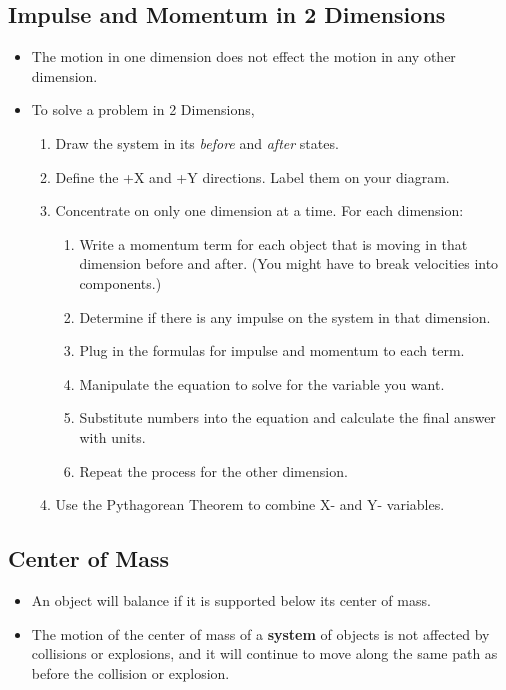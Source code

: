 \documentclass[letterpaper, 12pt]{article}
\begin{document}
\subsection*{Impulse and Momentum in 2 Dimensions}
\begin{itemize}

	\item The motion in one dimension does not effect the motion in any other dimension.
	\item To solve a problem in 2 Dimensions,
	\begin{enumerate}
		\item Draw the system in its \textit{before} and \textit{after} states.  
		\item Define the +X and +Y directions.  Label them on your diagram.
		\item Concentrate on only one dimension at a time.  For each dimension:
			\begin{enumerate}
				\item Write a momentum term for each object that is moving in that dimension before and after.  (You might have to break velocities into components.)
				\item Determine if there is any impulse on the system in that dimension.
				\item Plug in the formulas for impulse and momentum to each term.
				\item Manipulate the equation to solve for the variable you want.
				\item Substitute numbers into the equation and calculate the final answer with units. 
				\item Repeat the process for the other dimension.
			\end{enumerate}
		\item Use the Pythagorean Theorem to combine X- and Y- variables.
			
		
	\end{enumerate}
\end{itemize}

\subsection*{Center of Mass}
\begin{itemize}
	\item An object will balance if it is supported below its center of mass. 
	\item The motion of the center of mass of a \textbf{system} of objects is not affected by collisions or explosions, and it will continue to move along the same path as before the collision or explosion.  
	
	
\end{itemize}

 
\end{document}
